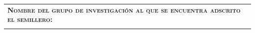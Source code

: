 \documentclass[12pt]{report}
\begin{document}
\begin{minipage}{\textwidth}
	\begin{tabular}{l}
		\begin{minipage}[t]{\textwidth}%
			\cellcolor{blue!10}\textsc{\textbf{Nombre del grupo de investigación al que se encuentra adscrito el semillero:}}
		\end{minipage}
		\vspace{0.1cm}\\
		\begin{minipage}[t]{\textwidth}%
			\cellcolor{white!10}{\resgroup}
		\end{minipage}
	\end{tabular}	
\end{minipage}
\end{document}
